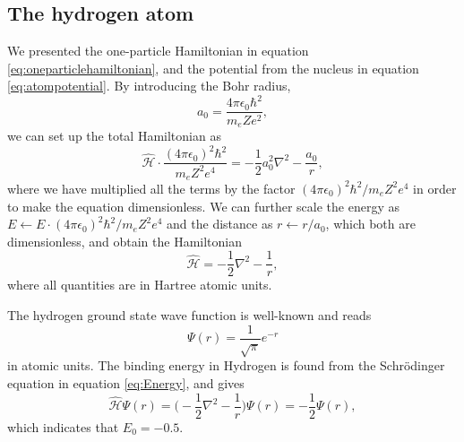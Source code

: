 \subsection{The hydrogen atom} \label{sec:hydrogen}
We presented the one-particle Hamiltonian in equation \eqref{eq:oneparticlehamiltonian}, and the potential from the nucleus in equation \eqref{eq:atompotential}. By introducing the Bohr radius,
\begin{equation}
a_0=\frac{4\pi\epsilon_0\hbar^2}{m_eZe^2},
\end{equation}
we can set up the total Hamiltonian as
\begin{equation}
\hat{\mathcal{H}}\cdot\frac{(4\pi\epsilon_0)^2\hbar^2}{m_eZ^2e^4}=-\frac{1}{2}a_0^2\nabla^2-\frac{a_0}{r},
\end{equation}
where we have multiplied all the terms by the factor $(4\pi\epsilon_0)^2\hbar^2/m_eZ^2e^4$ in order to make the equation dimensionless. We can further scale the energy as $E\leftarrow E\cdot (4\pi\epsilon_0)^2\hbar^2/m_eZ^2e^4$ and the distance as $r\leftarrow r/a_0$, which both are dimensionless, and obtain the Hamiltonian
\begin{equation}
\hat{\mathcal{H}}=-\frac{1}{2}\nabla^2-\frac{1}{r},
\end{equation}
where all quantities are in Hartree atomic units.

The hydrogen ground state wave function is well-known and reads
\begin{equation}
\Psi(r)=\frac{1}{\sqrt{\pi}}e^{-r}
\end{equation}
in atomic units. The binding energy in Hydrogen is found from the Schrödinger equation in equation \eqref{eq:Energy}, and gives
\begin{equation}
\hat{\mathcal{H}}\Psi(r)=\bigg(-\frac{1}{2}\nabla^2-\frac{1}{r}\bigg)\Psi(r)=-\frac{1}{2}\Psi(r),
\end{equation}
which indicates that $E_0=-0.5$.

\iffalse
